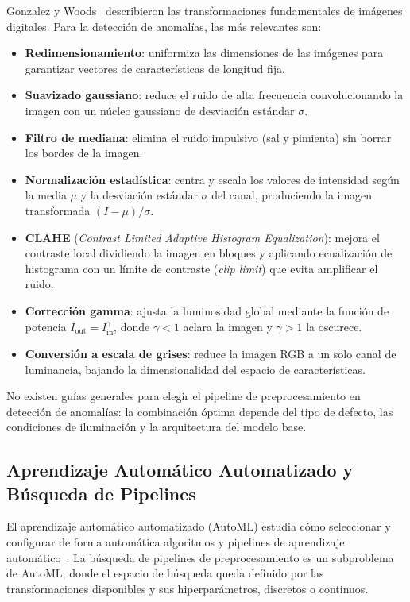 \documentclass[conference,spanish]{IEEEtran}
\begin{document}
Gonzalez y Woods~\cite{gonzalez2018dip} describieron las transformaciones
fundamentales de imágenes digitales. Para la detección de anomalías, las
más relevantes son:

\begin{itemize}
\item \textbf{Redimensionamiento}: uniformiza las dimensiones de las
  imágenes para garantizar vectores de características de longitud fija.
\item \textbf{Suavizado gaussiano}: reduce el ruido de alta frecuencia
  convolucionando la imagen con un núcleo gaussiano de desviación
  estándar $\sigma$.
\item \textbf{Filtro de mediana}: elimina el ruido impulsivo (sal
  y pimienta) sin borrar los bordes de la imagen.
\item \textbf{Normalización estadística}: centra y escala los valores de
  intensidad según la media $\mu$ y la desviación estándar $\sigma$ del
  canal, produciendo la imagen transformada $(I - \mu)/\sigma$.
\item \textbf{CLAHE} (\textit{Contrast Limited Adaptive Histogram
  Equalization}): mejora el contraste local dividiendo la imagen en
  bloques y aplicando ecualización de histograma con un límite de
  contraste (\textit{clip limit}) que evita amplificar el ruido.
\item \textbf{Corrección gamma}: ajusta la luminosidad global mediante la
  función de potencia $I_{\text{out}} = I_{\text{in}}^{\gamma}$, donde
  $\gamma < 1$ aclara la imagen y $\gamma > 1$ la oscurece.
\item \textbf{Conversión a escala de grises}: reduce la imagen RGB a un
  solo canal de luminancia, bajando la dimensionalidad del espacio de
  características.
\end{itemize}

No existen guías generales para elegir el pipeline de preprocesamiento en
detección de anomalías: la combinación óptima depende del tipo de defecto,
las condiciones de iluminación y la arquitectura del modelo base.

\subsection{Aprendizaje Automático Automatizado y Búsqueda de Pipelines}

El aprendizaje automático automatizado (AutoML) estudia cómo
seleccionar y configurar de forma automática algoritmos y pipelines de
aprendizaje automático~\cite{yang2020automl}. La búsqueda de pipelines de
preprocesamiento es un subproblema de AutoML, donde el espacio de búsqueda
queda definido por las transformaciones disponibles y sus hiperparámetros,
discretos o continuos.
\end{document}

